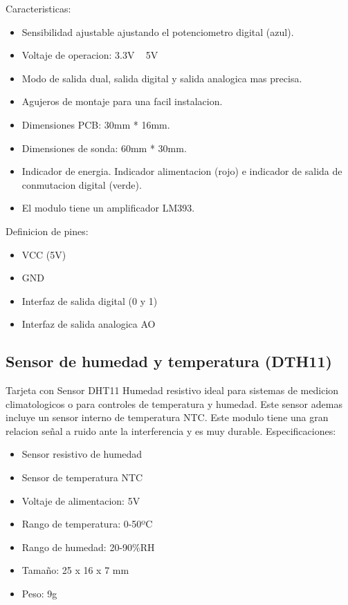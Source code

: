 \documentclass{article}
\begin{document}
Caracteristicas:
\begin{itemize}
	\item Sensibilidad ajustable ajustando el potenciometro digital (azul).
	\item Voltaje de operacion: 3.3V ~ 5V
	\item Modo de salida dual, salida digital y salida analogica mas precisa.
	\item Agujeros de montaje para una facil instalacion.
	\item Dimensiones PCB: 30mm * 16mm.
	\item Dimensiones de sonda: 60mm * 30mm.
	\item Indicador de energia. Indicador alimentacion (rojo) e indicador de salida de conmutacion digital (verde).
	\item El modulo tiene un amplificador LM393.
\end{itemize}

Definicion de pines:
\begin{itemize}
	\item VCC (5V)
	\item GND
	\item Interfaz de salida digital (0 y 1) 
	\item Interfaz de salida analogica AO
\end{itemize}

\subsection{Sensor de humedad  y temperatura (DTH11)}
Tarjeta con Sensor DHT11 Humedad resistivo ideal para sistemas de medicion climatologicos o para controles de temperatura y humedad. Este sensor ademas incluye un sensor interno de temperatura NTC. Este modulo tiene una gran relacion señal a ruido ante la interferencia y es muy durable.
Especificaciones:

\begin{itemize}
	\item Sensor resistivo de humedad
	\item Sensor de temperatura NTC
	\item Voltaje de alimentacion: 5V
	\item Rango de temperatura: 0-50ºC
	\item Rango de humedad: 20-90{\%}RH
	\item Tamaño: 25 x 16 x 7 mm
	\item Peso: 9g
\end{itemize}
\end{document}
